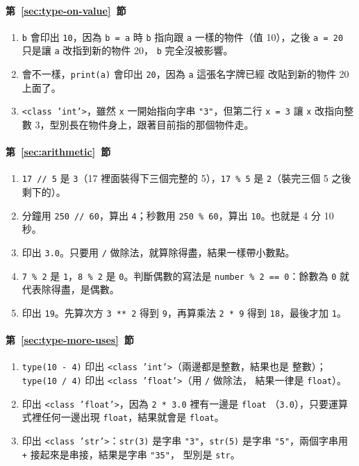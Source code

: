 \paragraph{第~\ref{sec:type-on-value}~節}
\begin{enumerate}
\item \texttt{b} 會印出 \texttt{10}，因為 \texttt{b = a} 時 \texttt{b} 指向跟 \texttt{a}
一樣的物件（值 10），之後 \texttt{a = 20} 只是讓 \texttt{a} 改指到新的物件 20，
\texttt{b} 完全沒被影響。
\item 會不一樣，\texttt{print(a)} 會印出 \texttt{20}，因為 \texttt{a} 這張名字牌已經
改貼到新的物件 20 上面了。
\item \texttt{<class 'int'>}，雖然 \texttt{x} 一開始指向字串 \texttt{"3"}，但第二行
\texttt{x = 3} 讓 \texttt{x} 改指向整數 3，型別長在物件身上，跟著目前指的那個物件走。
\end{enumerate}

\paragraph{第~\ref{sec:arithmetic}~節}
\begin{enumerate}
\item \texttt{17 // 5} 是 \texttt{3}（17 裡面裝得下三個完整的 5），\texttt{17 \% 5} 是
\texttt{2}（裝完三個 5 之後剩下的）。
\item 分鐘用 \texttt{250 // 60}，算出 \texttt{4}；秒數用 \texttt{250 \% 60}，算出
\texttt{10}。也就是 4 分 10 秒。
\item 印出 \texttt{3.0}。只要用 \texttt{/} 做除法，就算除得盡，結果一樣帶小數點。
\item \texttt{7 \% 2} 是 \texttt{1}，\texttt{8 \% 2} 是 \texttt{0}。判斷偶數的寫法是
\texttt{number \% 2 == 0}：餘數為 \texttt{0} 就代表除得盡，是偶數。
\item 印出 \texttt{19}。先算次方 \texttt{3 ** 2} 得到 \texttt{9}，再算乘法
\texttt{2 * 9} 得到 \texttt{18}，最後才加 \texttt{1}。
\end{enumerate}

\paragraph{第~\ref{sec:type-more-uses}~節}
\begin{enumerate}
\item \texttt{type(10 - 4)} 印出 \texttt{<class 'int'>}（兩邊都是整數，結果也是
整數）；\texttt{type(10 / 4)} 印出 \texttt{<class 'float'>}（用 \texttt{/} 做除法，
結果一律是 \texttt{float}）。
\item 印出 \texttt{<class 'float'>}，因為 \texttt{2 * 3.0} 裡有一邊是 \texttt{float}
（\texttt{3.0}），只要運算式裡任何一邊出現 \texttt{float}，結果就會是 \texttt{float}。
\item 印出 \texttt{<class 'str'>}：\texttt{str(3)} 是字串 \texttt{"3"}，\texttt{str(5)}
是字串 \texttt{"5"}，兩個字串用 \texttt{+} 接起來是串接，結果是字串 \texttt{"35"}，
型別是 \texttt{str}。
\end{enumerate}

